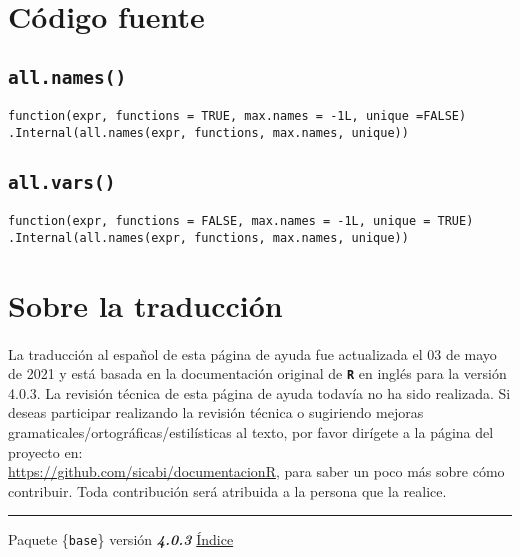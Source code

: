 \documentclass{article}[letter, 12pt]
\newlength\tindent
\renewcommand{\indent}{\hspace*{\tindent}}
\def\code#1{\texttt{#1}}
\def\codename#1{\textbf{\texttt{\color{gray}#1}}}
\begin{document}
\section{\color{gray}Código fuente}
\subsection{\color{gray} \code{all.names()}}
\indent\code{function(expr, functions = TRUE, max.names = -1L, unique =FALSE)} \\
\indent\indent\code{.Internal(all.names(expr, functions, max.names, unique))}\\
\subsection{\color{gray}\code{all.vars()}}
\indent\code{function(expr, functions = FALSE, max.names = -1L, unique = TRUE)} \\
\indent\indent\code{.Internal(all.names(expr, functions, max.names, unique))}\\

\section{\color{gray}Sobre la traducción}
\paragraph{}
La traducción al español de esta página de ayuda fue actualizada el 03 de mayo de 2021 y está basada en la documentación original de \codename{R} en inglés para la versión 4.0.3. La revisión técnica de esta página de ayuda todavía no ha sido realizada. Si deseas participar realizando la revisión técnica o sugiriendo mejoras gramaticales/ortográficas/estilísticas al texto, por favor dirígete a la página del proyecto en: \\\href{https://github.com/sicabi/documentacionR}{https://github.com/sicabi/documentacionR}, para saber un poco más sobre cómo contribuir. Toda contribución será atribuida a la persona que la realice.
\\
\par\noindent\rule{\textwidth}{0.4pt}
\centerline{Paquete \{\code{base}\} versión \textbf{\emph{4.0.3}} \href{run:/Vocabulary.pdf}{Índice}}
\end{document}
